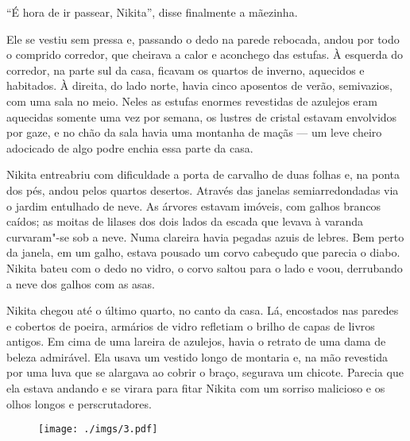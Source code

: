 ``É hora de ir passear, Nikita'', disse finalmente a mãezinha.

Ele se vestiu sem pressa e, passando o dedo na parede rebocada, andou
por todo o comprido corredor, que cheirava a calor e aconchego das
estufas. À esquerda do corredor, na parte sul da casa, ficavam os
quartos de inverno, aquecidos e habitados. À direita, do lado norte,
havia cinco aposentos de verão, semivazios, com uma sala no meio. Neles
as estufas enormes revestidas de azulejos eram aquecidas somente uma vez
por semana, os lustres de cristal estavam envolvidos por gaze, e no chão
da sala havia uma montanha de maçãs --- um leve cheiro adocicado de algo
podre enchia essa parte da casa.

Nikita entreabriu com dificuldade a porta de carvalho de duas folhas e,
na ponta dos pés, andou pelos quartos desertos. Através das janelas
semiarredondadas via o jardim entulhado de neve. As árvores estavam
imóveis, com galhos brancos caídos; as moitas de lilases dos dois lados
da escada que levava à varanda curvaram"-se sob a neve. Numa clareira
havia pegadas azuis de lebres. Bem perto da janela, em um galho, estava
pousado um corvo cabeçudo que parecia o diabo. Nikita bateu com o dedo
no vidro, o corvo saltou para o lado e voou, derrubando a neve dos
galhos com as asas.

Nikita chegou até o último quarto, no canto da casa. Lá, encostados nas
paredes e cobertos de poeira, armários de vidro refletiam o
brilho de capas de livros antigos. Em cima de uma lareira de
azulejos, havia o retrato de uma dama de beleza admirável. Ela usava
um vestido longo de montaria e, na mão revestida por uma luva que se
alargava ao cobrir o braço, segurava um chicote. Parecia que ela estava
andando e se virara para fitar Nikita com um sorriso malicioso e os
olhos longos e perscrutadores.

\begin{figure}
\vspace*{-2.1cm}
\hspace*{-2.5cm}\texttt{[image: ./imgs/3.pdf]}
\end{figure}


